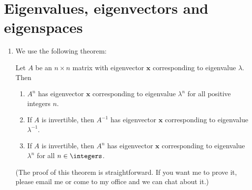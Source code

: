 \documentclass[english,12pt,a4paper]{scrartcl}
\renewcommand{\vec}[1]{\bm{#1}}
\begin{document}
\section*{Eigenvalues, eigenvectors and eigenspaces}
\begin{enumerate}[start=6]
  \item %
    We use the following theorem:
    \begin{mdframed}
      \begin{theorem}
        Let $A$ be an $n \times n$ matrix with eigenvector $\vec{x}$ 
        corresponding to eigenvalue $\lambda$. Then
        \begin{enumerate}
          \item $A^n$ has eigenvector $\vec{x}$ corresponding to eigenvalue 
            $\lambda^n$ for all positive integers $n$.
          \item If $A$ is invertible, then $A^{-1}$ has eigenvector $\vec{x}$ 
            corresponding to eigenvalue $\lambda^{-1}$.
          \item If $A$ is invertible, then $A^{n}$ has eigenvector $\vec{x}$ 
            corresponding to eigenvalue $\lambda^n$ for all $n \in \integers$.
        \end{enumerate}
      \end{theorem}

      (The proof of this theorem is straightforward. If you want me to prove it, 
      please email me or come to my office and we can chat about it.)
    \end{mdframed}
    

\end{enumerate}
\end{document}
